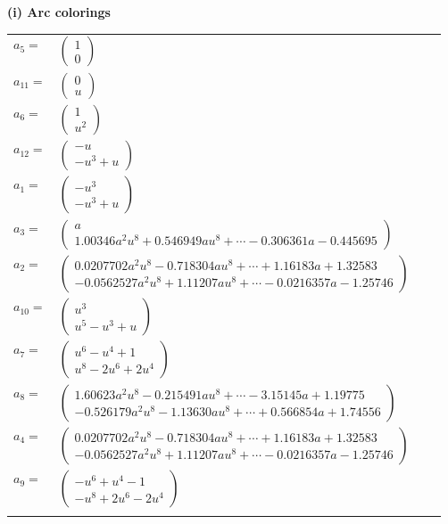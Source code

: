 \documentclass[1p]{elsarticle_modified}
\theoremstyle{definition}
\begin{document}
\flushleft \textbf{(i) Arc colorings}\\
\begin{tabular}{m{7pt} m{180pt} m{7pt} m{180pt} }
\flushright $a_{5}=$&$\begin{pmatrix}1\\0\end{pmatrix}$ \\
\flushright $a_{11}=$&$\begin{pmatrix}0\\u\end{pmatrix}$ \\
\flushright $a_{6}=$&$\begin{pmatrix}1\\u^2\end{pmatrix}$ \\
\flushright $a_{12}=$&$\begin{pmatrix}- u\\- u^3+u\end{pmatrix}$ \\
\flushright $a_{1}=$&$\begin{pmatrix}- u^3\\- u^3+u\end{pmatrix}$ \\
\flushright $a_{3}=$&$\begin{pmatrix}a\\1.00346 a^{2} u^{8}+0.546949 a u^{8}+\cdots-0.306361 a-0.445695\end{pmatrix}$ \\
\flushright $a_{2}=$&$\begin{pmatrix}0.0207702 a^{2} u^{8}-0.718304 a u^{8}+\cdots+1.16183 a+1.32583\\-0.0562527 a^{2} u^{8}+1.11207 a u^{8}+\cdots-0.0216357 a-1.25746\end{pmatrix}$ \\
\flushright $a_{10}=$&$\begin{pmatrix}u^3\\u^5- u^3+u\end{pmatrix}$ \\
\flushright $a_{7}=$&$\begin{pmatrix}u^6- u^4+1\\u^8-2 u^6+2 u^4\end{pmatrix}$ \\
\flushright $a_{8}=$&$\begin{pmatrix}1.60623 a^{2} u^{8}-0.215491 a u^{8}+\cdots-3.15145 a+1.19775\\-0.526179 a^{2} u^{8}-1.13630 a u^{8}+\cdots+0.566854 a+1.74556\end{pmatrix}$ \\
\flushright $a_{4}=$&$\begin{pmatrix}0.0207702 a^{2} u^{8}-0.718304 a u^{8}+\cdots+1.16183 a+1.32583\\-0.0562527 a^{2} u^{8}+1.11207 a u^{8}+\cdots-0.0216357 a-1.25746\end{pmatrix}$ \\
\flushright $a_{9}=$&$\begin{pmatrix}- u^6+u^4-1\\- u^8+2 u^6-2 u^4\end{pmatrix}$\\&\end{tabular}
\end{document}
